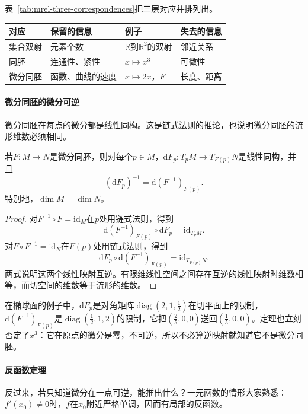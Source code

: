 表~\ref{tab:mrel-three-correspondences}把三层对应并排列出。

\begin{BookInlineTable}
  \centering
  \begin{tabular}{llll}
    \toprule
    对应 & 保留的信息 & 例子 & 失去的信息\\
    \midrule
    集合双射 & 元素个数 & $\mathbb R$到$\mathbb R^2$的双射 & 邻近关系\\
    同胚 & 连通性、紧性 & $x\mapsto x^3$ & 可微性\\
    微分同胚 & 函数、曲线的速度 & $x\mapsto 2x$，$F$ & 长度、距离\\
    \bottomrule
  \end{tabular}
  \caption{三层对应所保留的信息。}
  \label{tab:mrel-three-correspondences}
\end{BookInlineTable}

\paragraph{微分同胚的微分可逆}
微分同胚在每点的微分都是线性同构。这是链式法则的推论，也说明微分同胚的流形维数必须相同。

\begin{theorem}[微分同胚的微分]
\label{thm:mrel-diffeo-differential}
若$F:M\to N$是微分同胚，则对每个$p\in M$，$\mathrm dF_p:T_pM\to T_{F(p)}N$是线性同构，并且
\begin{equation}
(\mathrm dF_p)^{-1}=\mathrm d(F^{-1})_{F(p)}.
\label{eq:mrel-inverse-differential}
\end{equation}
特别地，$\dim M=\dim N$。
\end{theorem}

\begin{proof}
对$F^{-1}\circ F=\mathrm{id}_M$在$p$处用链式法则，得到
\[
\mathrm d(F^{-1})_{F(p)}\circ\mathrm dF_p=\mathrm{id}_{T_pM}.
\]
对$F\circ F^{-1}=\mathrm{id}_N$在$F(p)$处用链式法则，得到
\[
\mathrm dF_p\circ\mathrm d(F^{-1})_{F(p)}=\mathrm{id}_{T_{F(p)}N}.
\]
两式说明这两个线性映射互逆。有限维线性空间之间存在互逆的线性映射时维数相等，而切空间的维数等于流形的维数。
\end{proof}

在椭球面的例子中，$\mathrm dF_p$是对角矩阵$\operatorname{diag}(2,1,\tfrac12)$在切平面上的限制，$\mathrm d(F^{-1})_{F(p)}$是$\operatorname{diag}(\tfrac12,1,2)$的限制，它把$(\tfrac25,0,0)$送回$(\tfrac15,0,0)$。定理也立刻否定了$x^3$：它在原点的微分是零，不可逆，所以不必算逆映射就知道它不是微分同胚。

\paragraph{反函数定理}
反过来，若只知道微分在一点可逆，能推出什么？一元函数的情形大家熟悉：$f'(x_0)\neq0$时，$f$在$x_0$附近严格单调，因而有局部的反函数。

